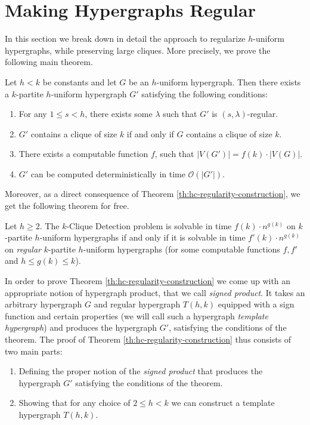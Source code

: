 \documentclass[a4paper,UKenglish,cleveref, autoref, thm-restate,numberwithinsect]{lipics-v2021}
\newcommand{\bigO}{\mathcal{O}}
\newcommand{\reg}{\lambda}
\begin{document}
\section{Making Hypergraphs Regular} \label{sec:regularizing-hypergraphs}
In this section we break down in detail the approach to regularize $h$-uniform hypergraphs, while preserving large cliques.
More precisely, we prove the following main theorem.
\begin{theorem}\label{th:hc-regularity-construction}
    Let $h < k$ be constants and let $G$ be an $h$-uniform hypergraph. Then there exists a $k$-partite $h$-uniform hypergraph $G'$ satisfying the following conditions:
    \begin{enumerate}
        \item For any $1\leq s<h$, there exists some $\reg$ such that $G'$ is $(s,\reg)$-regular.
        \item $G'$ contains a clique of size $k$ if and only if $G$ contains a clique of size $k$.
        \item There exists a computable function $f$, such that $|V(G')| = f(k)\cdot |V(G)|$.
        \item $G'$ can be computed deterministically in time $\bigO(|G'|)$.
    \end{enumerate}
\end{theorem}
Moreover, as a direct consequence of Theorem \ref{th:hc-regularity-construction}, we get the following theorem for free.
\begin{theorem}\label{th:regular-hc-hypothesis}
    Let $h \geq 2$. The $k$-Clique Detection problem is solvable in time $f(k) \cdot n^{g(k)}$ on $k$-partite $h$-uniform hypergraphs if and only if it is solvable in time $f'(k) \cdot n^{g(k)}$ on \emph{regular} $k$-partite $h$-uniform hypergraphs (for some computable functions $f, f'$ and $h\leq g(k)\leq k$).
\end{theorem}
In order to prove Theorem \ref{th:hc-regularity-construction} we come up with an appropriate notion of hypergraph product, that we call \emph{signed product}. It takes an arbitrary hypergraph $G$ and regular hypergraph $T(h,k)$ equipped with a sign function and certain properties (we will call such a hypergraph \emph{template hypergraph}) and produces the hypergraph $G'$, satisfying the conditions of the theorem. 
The proof of Theorem \ref{th:hc-regularity-construction} thus consists of two main parts:
\begin{enumerate}
    \item Defining the proper notion of the \emph{signed product} that produces the hypergraph $G'$ satisfying the conditions of the theorem.
    \item Showing that for any choice of $2\leq h<k$ we can construct a template hypergraph $T(h,k)$.
\end{enumerate}
\end{document}
